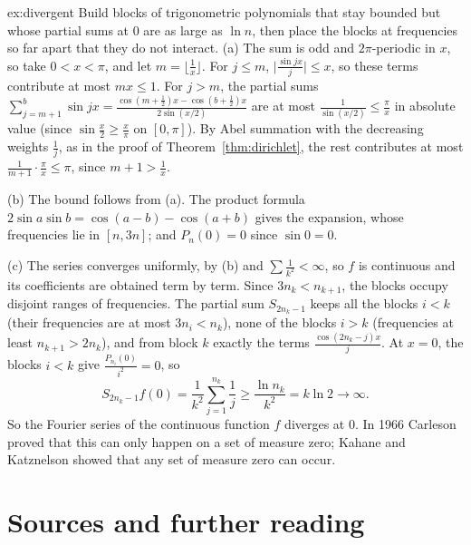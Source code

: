\begin{solution}{ex:divergent}
\idea Build blocks of trigonometric polynomials that stay bounded but whose partial sums at $0$ are as large as $\ln n$, then
place the blocks at frequencies so far apart that they do not interact.
\writeup (a) The sum is odd and $2\pi$-periodic in $x$, so take $0<x<\pi$, and let $m=\lfloor\frac1x\rfloor$. For $j\le m$, $\bigl|\frac{\sin jx}j\bigr|\le x$, so these
terms contribute at most $mx\le1$. For $j>m$, the partial sums $\sum_{j=m+1}^b\sin jx=\frac{\cos(m+\frac12)x-\cos(b+\frac12)x}{2\sin(x/2)}$ are at most $\frac1{\sin(x/2)}\le\frac\pi x$
in absolute value (since $\sin\frac x2\ge\frac x\pi$ on $[0,\pi]$). By Abel summation with the decreasing weights $\frac1j$, as in the proof of
Theorem~\ref{thm:dirichlet}, the rest contributes at most $\frac1{m+1}\cdot\frac\pi x\le\pi$, since $m+1>\frac1x$.

(b) The bound follows from (a). The product formula $2\sin a\sin b=\cos(a-b)-\cos(a+b)$ gives the expansion, whose frequencies lie in
$[n,3n]$; and $P_n(0)=0$ since $\sin0=0$.

(c) The series converges uniformly, by (b) and $\sum\frac1{k^2}<\infty$, so $f$ is continuous and its coefficients are obtained term by
term. Since $3n_k<n_{k+1}$, the blocks occupy disjoint ranges of frequencies. The partial sum $S_{2n_k-1}$ keeps all the blocks
$i<k$ (their frequencies are at most $3n_i<n_k$), none of the blocks $i>k$ (frequencies at least $n_{k+1}>2n_k$), and from block $k$ exactly the terms
$\frac{\cos(2n_k-j)x}{j}$. At $x=0$, the blocks $i<k$ give $\frac{P_{n_i}(0)}{i^2}=0$, so
\[
S_{2n_k-1}f(0)=\frac1{k^2}\sum_{j=1}^{n_k}\frac1j\ge\frac{\ln n_k}{k^2}=k\ln2\to\infty.
\]
So the Fourier series of the continuous function $f$ diverges at $0$. In 1966 Carleson proved that this can only happen on a set
of measure zero; Kahane and Katznelson showed that any set of measure zero can occur.
\end{solution}

\section*{Sources and further reading}

